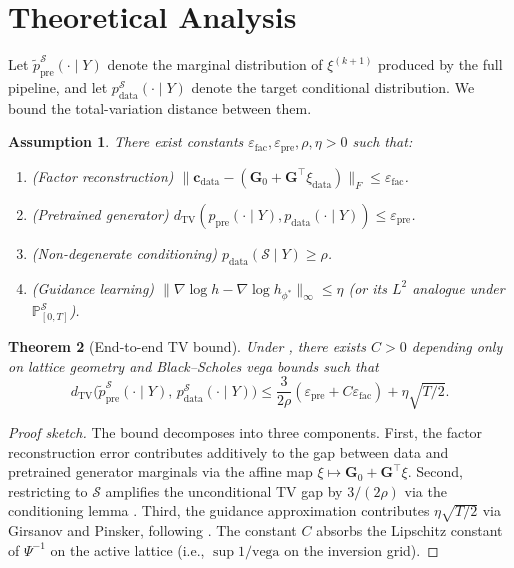 \documentclass{article}
\newtheorem{theorem}{Theorem}
\newtheorem{assumption}[theorem]{Assumption}
\newcommand{\Prob}{\mathbb{P}}
\newcommand{\1}{\mathbf{1}}
\newcommand{\cS}{\mathcal{S}}
\begin{document}
\section{Theoretical Analysis}
\label{sec:theory}

Let $\tilde p_{\text{pre}}^\cS(\cdot \mid Y)$ denote the marginal distribution of $\xi^{(k+1)}$ produced by the full pipeline, and let $p_{\text{data}}^\cS(\cdot \mid Y)$ denote the target conditional distribution. We bound the total-variation distance between them.

\begin{assumption}
\label{ass:main}
There exist constants $\varepsilon_{\mathrm{fac}}, \varepsilon_{\mathrm{pre}}, \rho, \eta > 0$ such that:
\begin{enumerate}
\item[(i)] (Factor reconstruction) $\| \mathbf{c}_{\text{data}} - (\mathbf{G}_0 + \mathbf{G}^\top \xi_{\text{data}}) \|_F \le \varepsilon_{\mathrm{fac}}$.
\item[(ii)] (Pretrained generator) $d_{\mathrm{TV}}(p_{\text{pre}}(\cdot \mid Y), p_{\text{data}}(\cdot \mid Y)) \le \varepsilon_{\mathrm{pre}}$.
\item[(iii)] (Non-degenerate conditioning) $p_{\text{data}}(\cS \mid Y) \ge \rho$.
\item[(iv)] (Guidance learning) $\| \nabla \log h - \nabla \log h_{\phi^*} \|_\infty \le \eta$ (or its $L^2$ analogue under $\Prob^{\cS}_{[0,T]}$).
\end{enumerate}
\end{assumption}

\begin{theorem}[End-to-end TV bound]
\label{thm:main}
Under , there exists $C > 0$ depending only on lattice geometry and Black--Scholes vega bounds such that
\begin{equation}
d_{\mathrm{TV}}\bigl( \tilde p_{\text{pre}}^\cS(\cdot \mid Y),\, p_{\text{data}}^\cS(\cdot \mid Y) \bigr) \le \frac{3}{2\rho} (\varepsilon_{\mathrm{pre}} + C\varepsilon_{\mathrm{fac}}) + \eta \sqrt{T/2}.
\label{eq:main}
\end{equation}
\end{theorem}

\begin{proof}[Proof sketch]
The bound decomposes into three components. First, the factor reconstruction error contributes additively to the gap between data and pretrained generator marginals via the affine map $\xi \mapsto \mathbf{G}_0 + \mathbf{G}^\top \xi$. Second, restricting to $\cS$ amplifies the unconditional TV gap by $3/(2\rho)$ via the conditioning lemma \citep[Lemma 4.2]{guo2026}. Third, the guidance approximation contributes $\eta\sqrt{T/2}$ via Girsanov and Pinsker, following \citep[Lemma 4.3]{guo2026}. The constant $C$ absorbs the Lipschitz constant of $\Psi^{-1}$ on the active lattice (i.e., $\sup 1/\text{vega}$ on the inversion grid).
\end{proof}
\end{document}
